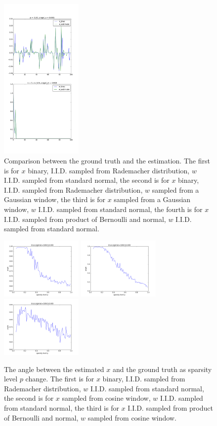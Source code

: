 \documentclass[letter, 10pt]{article}
\numberwithin{equation}{section}
\begin{document}
\begin{figure}
\includegraphics[width=4cm,keepaspectratio]{fig/Collect_Series_x_BernNorm_w_Norm_noA_n100_k5_p0_30_sigma0_00.png}
\caption{Comparison between the ground truth and the estimation. The first is for $x$ binary, I.I.D. sampled from Rademacher distribution, $w$ I.I.D. sampled from standard normal, the second is for $x$ binary, I.I.D. sampled from Rademacher distribution, $w$ sampled from a Gaussian window, the third is for $x$ sampled from a Gaussian window, $w$ I.I.D. sampled from standard normal, the fourth is for $x$ I.I.D. sampled from product of Bernoulli and normal, $w$ I.I.D. sampled from standard normal.}
\end{figure}


\begin{figure}
\includegraphics[width=4cm,keepaspectratio]{fig/w_norm_x_binary_n100_k5_p__sigma0_00.png}
 \includegraphics[width=4cm,keepaspectratio]{fig/w_Norm_x_cos_n100_k5_p__sigma0_00.png}
\includegraphics[width=4cm,keepaspectratio]{fig/w_cos_x_BerNorm_n100_k5_p__sigma0_00.png}
\caption{The angle between the estimated $x$ and the ground truth as sparsity level $p$ change. The first is for $x$ binary, I.I.D. sampled from Rademacher distribution, $w$ I.I.D. sampled from standard normal, the second is for $x$ sampled from cosine window, $w$ I.I.D. sampled from standard normal, the third is for $x$ I.I.D. sampled from product of Bernoulli and normal, $w$ sampled from cosine window.}
\end{figure}
\end{document}
